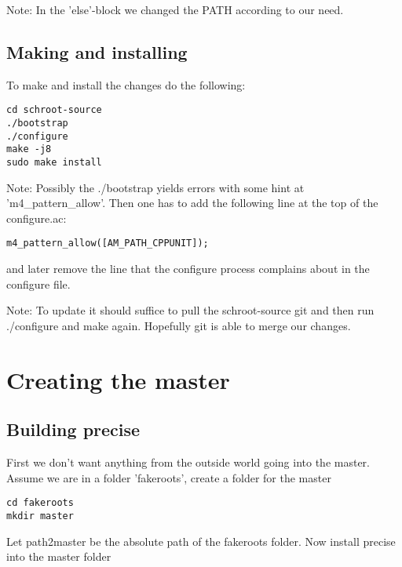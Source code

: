 \documentclass[a4paper]{book}
\begin{document}
Note: In the 'else'-block we changed the PATH according to our need.

\subsection{Making and installing}
To make and install the changes do the following:
\begin{verbatim}
cd schroot-source
./bootstrap
./configure
make -j8
sudo make install
\end{verbatim}

Note: Possibly the ./bootstrap yields errors with some hint at 'm4\_pattern\_allow'. Then one has to add the following line at the top of the configure.ac:
\begin{verbatim}
m4_pattern_allow([AM_PATH_CPPUNIT]);
\end{verbatim}
and later remove the line that the configure process complains about in the configure file.

Note: To update it should suffice to pull the schroot-source git and then run ./configure and make again. Hopefully git is able to merge our changes.

\section{Creating the master}
\subsection{Building precise}
First we don't want anything from the outside world going into the master.
Assume we are in a folder 'fakeroots', create a folder for the master

\begin{verbatim}
cd fakeroots
mkdir master
\end{verbatim}

Let path2master be the absolute path of the fakeroots folder.
Now install precise into the master folder
\end{document}
